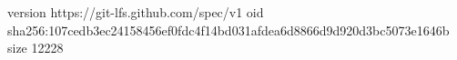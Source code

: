 version https://git-lfs.github.com/spec/v1
oid sha256:107cedb3ec24158456ef0fdc4f14bd031afdea6d8866d9d920d3bc5073e1646b
size 12228
